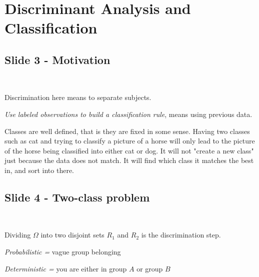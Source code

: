 \section{Discriminant Analysis and Classification}
\begin{figure}[ht!]
    \centering
    \caption{}
\end{figure}
\subsection{Slide 3 - Motivation}\hfill\\\par
\noindent Discrimination here means to separate subjects.\par
\noindent \textit{Use labeled observations to build a classification rule}, means using previous data.
\par\bigskip
\noindent Classes are well defined, that is they are fixed in some sense. Having two classes such as cat and trying to classify a picture of a horse will only lead to the picture of the horse being classified into either cat or dog. It will not "create a new class" just because the data does not match. It will find which class it matches the best in, and sort into there.
\par\bigskip
\subsection{Slide 4 - Two-class problem}\hfill\\\par
\noindent Dividing $\Omega$ into two disjoint sets $R_1$ and $R_2$ is the discrimination step.
\par\bigskip
\noindent \textit{Probabilistic = } vague group belonging\par
\noindent\textit{Deterministic = } you are either in group $A$ or group $B$
\par\bigskip

